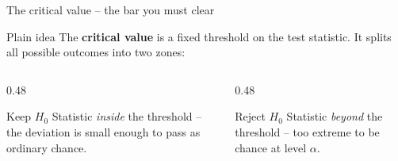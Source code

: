 \documentclass[aspectratio=169,11pt]{beamer}
\begin{document}
\begin{frame}{The critical value -- the bar you must clear}
  \begin{block}{Plain idea}
    The \textbf{critical value} is a fixed threshold on the test statistic. It
    splits all possible outcomes into two zones:
  \end{block}
  \begin{columns}[T]
    \begin{column}{0.48\textwidth}
      \begin{exampleblock}{Keep $H_0$}
        Statistic \emph{inside} the threshold -- the deviation is small enough
        to pass as ordinary chance.
      \end{exampleblock}
    \end{column}
    \begin{column}{0.48\textwidth}
      \begin{alertblock}{Reject $H_0$}
        Statistic \emph{beyond} the threshold -- too extreme to be chance at
        level $\alpha$.
      \end{alertblock}
    \end{column}
  \end{columns}
\end{frame}
\end{document}

